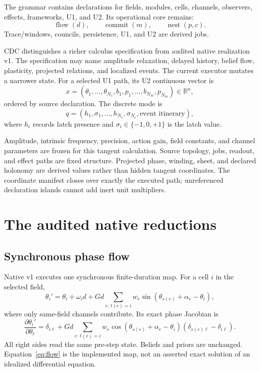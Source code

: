 \documentclass[11pt]{article}
\newcommand{\R}{\mathbb{R}}
\begin{document}
The grammar contains declarations for fields, modules, cells, channels,
observers, effects, frameworks, U1, and U2. Its operational core remains:
\[
\operatorname{flow}(d),\qquad
\operatorname{commit}(m),\qquad
\operatorname{nest}(p,c).
\]
Trace/windows, councils, persistence, U1, and U2 are derived jobs.

CDC distinguishes a richer calculus specification from audited native
realization v1. The specification may name amplitude relaxation, delayed
history, belief flow, plasticity, projected relations, and localized events.
The current executor mutates a narrower state. For a selected U1 path, its U2
continuous vector is
\begin{equation}
x=
(\theta_1,\ldots,\theta_{N_c},
 b_1,p_1,\ldots,b_{N_m},p_{N_m})\in\R^n,
\label{eq:state}
\end{equation}
ordered by source declaration. The discrete mode is
\[
q=(h_1,\sigma_1,\ldots,h_{N_c},\sigma_{N_c},
   \text{event itinerary}),
\]
where $h_i$ records latch presence and
$\sigma_i\in\{-1,0,+1\}$ is the latch value.

Amplitude, intrinsic frequency, precision, action gain, field constants, and
channel parameters are frozen for this tangent calculation. Source topology,
jobs, readout, and effect paths are fixed structure. Projected phase, winding,
sheet, and declared holonomy are derived values rather than hidden tangent
coordinates. The coordinate manifest closes over exactly the executed path;
unreferenced declaration islands cannot add inert unit multipliers.

\section{The audited native reductions}

\subsection{Synchronous phase flow}

Native v1 executes one synchronous finite-duration map. For a cell $i$ in the
selected field,
\begin{equation}
\theta_i' = \theta_i+\omega_i d
 +Gd\sum_{e:\,t(e)=i}w_e
 \sin(\theta_{s(e)}+\alpha_e-\theta_i),
\label{eq:flow}
\end{equation}
where only same-field channels contribute. Its exact phase Jacobian is
\begin{equation}
\frac{\partial\theta_i'}{\partial\theta_\ell}
=\delta_{i\ell}+Gd\sum_{e:\,t(e)=i}w_e
\cos(\theta_{s(e)}+\alpha_e-\theta_i)
(\delta_{s(e)\ell}-\delta_{i\ell}).
\label{eq:flow-jacobian}
\end{equation}
All right sides read the same pre-step state. Beliefs and priors are unchanged.
Equation~\eqref{eq:flow} is the implemented map, not an asserted exact solution
of an idealized differential equation.
\end{document}
